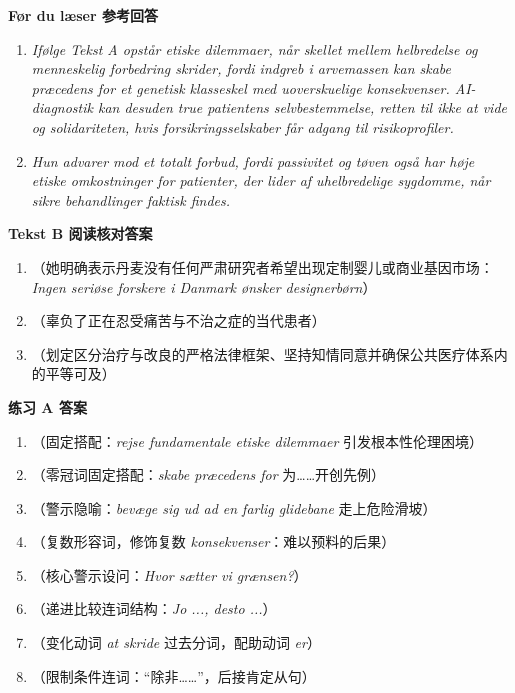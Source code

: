 \begin{answerbox}
\textbf{Før du læser 参考回答}
\begin{enumerate}
  \item \textit{Ifølge Tekst A opstår etiske dilemmaer, når skellet mellem helbredelse og menneskelig forbedring skrider, fordi indgreb i arvemassen kan skabe præcedens for et genetisk klasseskel med uoverskuelige konsekvenser. AI-diagnostik kan desuden true patientens selvbestemmelse, retten til ikke at vide og solidariteten, hvis forsikringsselskaber får adgang til risikoprofiler.}
  \item \textit{Hun advarer mod et totalt forbud, fordi passivitet og tøven også har høje etiske omkostninger for patienter, der lider af uhelbredelige sygdomme, når sikre behandlinger faktisk findes.}
\end{enumerate}

\textbf{Tekst B 阅读核对答案}
\begin{enumerate}
  \item {}（她明确表示丹麦没有任何严肃研究者希望出现定制婴儿或商业基因市场：\textit{Ingen seriøse forskere i Danmark ønsker designerbørn}）
  \item {}（辜负了正在忍受痛苦与不治之症的当代患者）
  \item {}（划定区分治疗与改良的严格法律框架、坚持知情同意并确保公共医疗体系内的平等可及）
\end{enumerate}

\textbf{练习 A 答案}
\begin{enumerate}
  \item {}（固定搭配：\textit{rejse fundamentale etiske dilemmaer} 引发根本性伦理困境）
  \item {}（零冠词固定搭配：\textit{skabe præcedens for} 为……开创先例）
  \item {}（警示隐喻：\textit{bevæge sig ud ad en farlig glidebane} 走上危险滑坡）
  \item {}（复数形容词，修饰复数 \textit{konsekvenser}：难以预料的后果）
  \item {}（核心警示设问：\textit{Hvor sætter vi grænsen?}）
  \item {}（递进比较连词结构：\textit{Jo ..., desto ...}）
  \item {}（变化动词 \textit{at skride} 过去分词，配助动词 \textit{er}）
  \item {}（限制条件连词：“除非……”，后接肯定从句）
\end{enumerate}


\end{answerbox}

